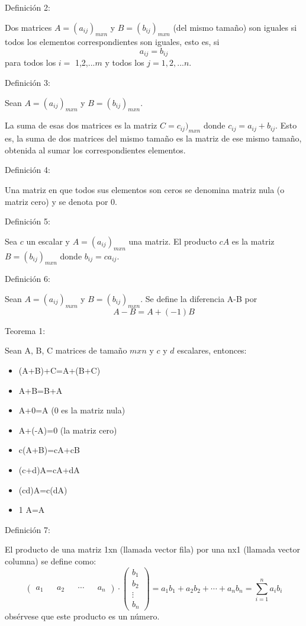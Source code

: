 \documentclass[twocolumn]{article}
\begin{document}
Definici\'on 2:

Dos matrices $A = (a_{ij})_{mxn}$ y $B = (b_{ij})_{mxn}$ (del mismo tamaño) son iguales si
todos los elementos correspondientes son iguales, esto es, si
$$ a_{ij}=b_{ij} $$
para todos los $i=$ 1,2,...$m$ y todos los $j=1,2,...n$.

Definici\'on 3:

Sean $A=(a_{ij})_{mxn}$ y $B = (b_{ij})_{mxn}$.

La suma de esas dos matrices es la matriz $C = c_{ij})_{mxn}$ donde $c_{ij}=a_{ij}+b_{ij}$.
Esto es, la suma de dos matrices del mismo tamaño es la matriz de ese mismo tamaño, obtenida
al sumar los correspondientes elementos.

Definici\'on 4:

Una matriz en que todos sus elementos son ceros se denomina matriz nula (o matriz cero) y se
denota por 0.

Definici\'on 5:

Sea $c$ un escalar y $A = (a_{ij})_{mxn}$ una matriz. El producto $cA$ es la matriz $B = (b_{ij})_{mxn}$ donde $b_{ij}=ca_{ij}$.

Definici\'on 6:

Sean $A = (a_{ij})_{mxn}$ y $B = (b_{ij})_{mxn}$. Se define la diferencia A-B por
$$ A-B= A+(-1)B $$

Teorema 1:

Sean A, B, C matrices de tamaño $m x n$ y $c$ y $d$ escalares, entonces:

\begin{itemize}
	\item (A+B)+C=A+(B+C)
	\item A+B=B+A
	\item A+0=A (0 es la matriz nula)
	\item A+(-A)=0 (la matriz cero)
	\item c(A+B)=cA+cB
	\item (c+d)A=cA+dA
	\item (cd)A=c(dA)
	\item 1 A=A
\end{itemize}

Definici\'on 7:

El producto de una matriz 1xn (llamada vector fila) por una nx1 (llamada vector columna) se
define como:
\begin{equation}
\begin{pmatrix}
a_1 && a_2 && \cdots && a_n
\end{pmatrix}
\cdot
\begin{pmatrix}
b_1 \\
b_2 \\
\vdots \\
b_n
\end{pmatrix}
= a_1b_1+a_2b_2+\cdots+a_nb_n = \displaystyle\sum_{i=1}^n a_ib_i
\end{equation}
obs\'ervese que este producto es un n\'umero.
\end{document}
